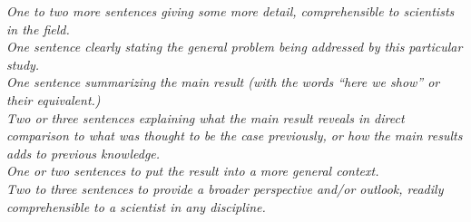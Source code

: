 \emph{One to two more sentences giving some more detail, comprehensible to scientists in the field.} \\

\emph{One sentence clearly stating the general problem being addressed by this particular study.} \\

\emph{One sentence summarizing the main result (with the words ``here we show'' or their equivalent.)} \\

\emph{Two or three sentences explaining what the main result reveals in direct comparison to what was thought to be the case previously, or how the main results adds to previous knowledge.} \\

\emph{One or two sentences to put the result into a more general context.} \\

\emph{Two to three sentences to provide a broader perspective and/or outlook, readily comprehensible to a scientist in any discipline.}